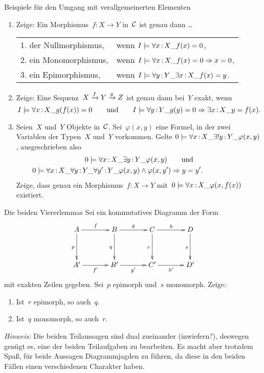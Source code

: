 \documentclass{uebblatt}
\begin{document}
\begin{aufgabe}{Beispiele für den Umgang mit verallgemeinerten Elementen}
\begin{enumerate}
\item Zeige: Ein Morphismus~$f : X \to Y$ in~$\mathcal{C}$ ist genau dann \ldots

\renewcommand{\arraystretch}{1.2}
\begin{tabular}{ll}
  1. der Nullmorphismus, & wenn
  $I \models \forall x\,{:}\,X\_ f(x) = 0$, \\
  2. ein Monomorphismus, & wenn
  $I \models \forall x\,{:}\,X\_ f(x) = 0 \Rightarrow x = 0$, \\
  3. ein Epimorphismus, & wenn
  $I \models \forall y\,{:}\,Y\_ \exists x\,{:}\,X\_ f(x) = y$.
\end{tabular}

\item Zeige: Eine Sequenz~$X \xrightarrow{f} Y \xrightarrow{g} Z$ ist genau dann bei~$Y$ exakt,
wenn
\[ I \models \forall x\,{:}\,X\_ g(f(x)) = 0
  \qquad\text{und}\qquad
  I \models \forall y\,{:}\,Y\_ g(y) = 0 \Rightarrow \exists x\,{:}\,X\_ y = f(x). \]

\item Seien~$X$ und~$Y$ Objekte in~$\mathcal{C}$. Sei~$\varphi(x,y)$ eine Formel, in der
zwei Variablen der Typen~$X$ und~$Y$ vorkommen. Gelte
$0 \models \forall x\,{:}\,X\_ \exists!y\,{:}\,Y\_ \varphi(x,y)$, ausgeschrieben also
\begin{multline*}0 \models \forall x\,{:}\,X\_ \exists y\,{:}\,Y\_ \varphi(x,y)
  \qquad\text{und} \\
  0 \models \forall x\,{:}\,X\_ \forall y\,{:}\,Y\_ \forall y'\,{:}\,Y\_ \varphi(x,y) \wedge \varphi(x,y')
  \Rightarrow y = y'. {\qquad\qquad\qquad} \end{multline*}
Zeige, dass genau ein Morphismus~$f : X \to Y$ mit~$0 \models \forall
x\,{:}\,X\_ \varphi(x,f(x))$ existiert.
\end{enumerate}
\end{aufgabe}

\newpage

\begin{aufgabe}{Die beiden Viererlemmas}
Sei ein kommutatives Diagramm der Form
\[ \xymatrixcolsep{3pc}\xymatrixrowsep{3pc}\xymatrix{
  A \ar[r]^f \ar[d]_p & B \ar[r]^g \ar[d]_q & C \ar[r]^h \ar[d]_r & D \ar[d]_s \\
  A' \ar[r]_{f'} & B' \ar[r]_{g'} & C' \ar[r]_{h'} & D'
} \]
mit exakten Zeilen gegeben. Sei~$p$ epimorph und~$s$ monomorph.
Zeige:
\begin{enumerate}
\item Ist~$r$ epimorph, so auch~$q$.
\item Ist~$q$ monomorph, so auch~$r$.
\end{enumerate}
\emph{Hinweis:} Die beiden Teilaussagen sind dual zueinander (inwiefern?),
deswegen genügt es, eine der beiden Teilaufgaben zu bearbeiten. Es macht aber
trotzdem Spaß, für beide Aussagen Diagrammjagden zu führen, da diese in den
beiden Fällen einen verschiedenen Charakter haben.
\end{aufgabe}
\end{document}
